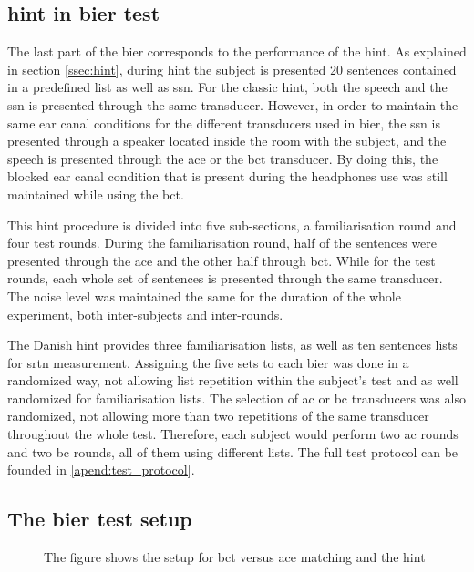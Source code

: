 \subsection{\gls{hint} in \gls{bier} test}
The last part of the \gls{bier} corresponds to the performance of the \gls{hint}. As explained in section \autoref{ssec:hint}, during \gls{hint} the subject is presented 20 sentences contained in a predefined list as well as \gls{ssn}. For the classic \gls{hint}, both the speech and the \gls{ssn} is presented through the same transducer. However, in order to maintain the same ear canal conditions for the different transducers used in \gls{bier}, the \gls{ssn} is presented through a speaker located inside the room with the subject, and the speech is presented through the  \gls{ace} or the \gls{bct} transducer. By doing this, the blocked ear canal condition that is present during the headphones use was still maintained while using the \gls{bct}.


This \gls{hint} procedure is divided into five sub-sections, a familiarisation round and four test rounds. During the familiarisation round, half of the sentences were presented through the \gls{ace} and the other half through \gls{bct}. While for the test rounds, each whole set of sentences is presented through the same transducer. The noise level was maintained the same for the duration of the whole experiment, both inter-subjects and inter-rounds.

The Danish \gls{hint} provides three familiarisation lists, as well as ten sentences lists for \gls{srtn} measurement. Assigning the five sets to each \gls{bier} was done in a randomized way, not allowing list repetition within the subject's test and as well randomized for familiarisation lists. The selection of \gls{ac} or \gls{bc} transducers was also randomized, not allowing more than two repetitions of the same transducer throughout the whole test. Therefore, each subject would perform two \gls{ac} rounds and two \gls{bc} rounds, all of them using different lists. The full test protocol can be founded in \autoref{apend:test_protocol}.


\subsection{The \gls{bier} test setup}


\newpage
\begin{figure}[H]
	\begin{sideways}
	\begin{minipage}{\textheight}
		\centering
\def\svgwidth{\columnwidth}

	\end{minipage}
	\end{sideways}
\caption{The figure shows the setup for \gls{bct} versus \gls{ace} matching and the \gls{hint} }
\label{fig:sec_bier_setup}
\end{figure}


